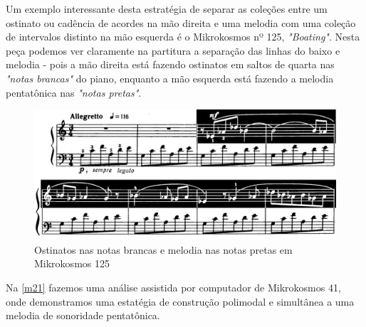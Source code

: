 \documentclass[
	12pt,				%
	openright,			%
	twoside,			%
	a4paper,			%
	english,			%
	french,				%
	spanish,			%
	brazil				%
	]{abntex2}
\begin{document}
\pagebreak
Um exemplo interessante desta estratégia de separar as coleções entre um ostinato ou cadência de acordes na mão direita e uma melodia com uma coleção de intervalos distinto na mão esquerda é o Mikrokosmos nº 125, \textit{"Boating"}. Nesta peça podemos ver claramente na partitura a separação das linhas do baixo e melodia - pois a mão direita está fazendo ostinatos em saltos de quarta nas \textit{"notas brancas"} do piano, enquanto a mão esquerda está fazendo a melodia pentatônica nas \textit{"notas pretas"}. 

\begin{figure}[!h]
	\caption{\label{fig_grafico}Ostinatos nas notas brancas e melodia nas notas pretas em Mikrokosmos 125 }
	\begin{center}
	    \includegraphics[scale=0.45]{ostinatos/boating_ostinato.png}
	\end{center}
\end{figure}

Na \autoref{m21} fazemos uma análise assistida por computador de Mikrokosmos 41, onde demonstramos uma estatégia de construção polimodal e simultânea a uma melodia de sonoridade pentatônica.








%
%
%
\end{document}
